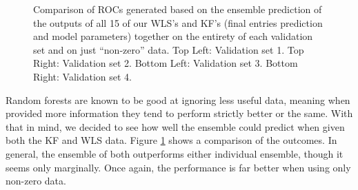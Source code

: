 \begin{figure}[h]
\caption{Comparison of ROCs generated based on the ensemble prediction of the outputs of all 15 of our WLS's and KF's (final entries prediction and model parameters) together on the entirety of each validation set and on just ``non-zero'' data. Top Left: Validation set 1. Top Right: Validation set 2. Bottom Left: Validation set 3. Bottom Right: Validation set 4.}
\label{fig:ensembleTimeCombs}
\end{figure}

Random forests are known to be good at ignoring less useful data, meaning when provided more information they tend to perform strictly better or the same. With that in mind, we decided to see how well the ensemble could predict when given both the KF and WLS data. Figure \ref{fig:ensembleTimeCombs} shows a comparison of the outcomes. In general, the ensemble of both outperforms either individual ensemble, though it seems only marginally. Once again, the performance is far better when using only non-zero data.

\pagebreak